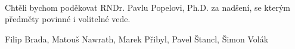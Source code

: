 \documentclass[../bakalarka-main.tex]{subfiles}
\begin{document}
	\newpage
	\thispagestyle{empty}
	
	\
	
	\vspace{18cm}\noindent Chtěli bychom poděkovat RNDr. Pavlu Popelovi, Ph.D. za nadšení, se kterým předměty povinné i volitelné vede. 
	
	\vspace{1cm}
	\hfill{Filip Brada, Matouš Nawrath, Marek Přibyl, Pavel Štancl, Šimon Volák}
	
	\newpage
	\thispagestyle{empty}
	\
\end{document}
